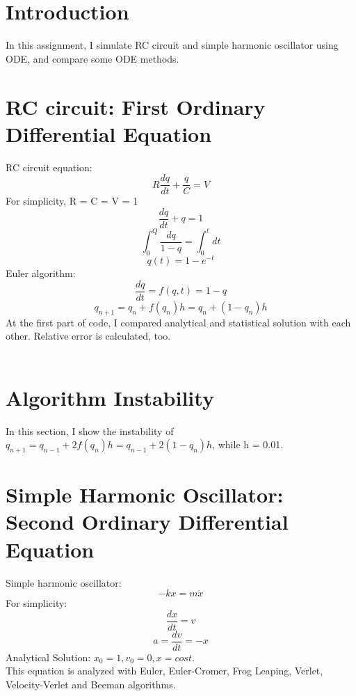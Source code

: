 \documentclass{article}
\begin{document}
\section{Introduction}
In this assignment, I simulate RC circuit and simple harmonic oscillator using ODE, and compare some ODE methods.
\section{RC circuit: First Ordinary Differential Equation}
RC circuit equation:\\
\begin{equation}
    R\frac{dq}{dt}+\frac{q}{C} = V
\end{equation}
For simplicity, R = C = V = 1\\
\begin{equation}
    \frac{dq}{dt}+q=1
\end{equation}
\begin{equation}
    \int _0^Q \frac{dq}{1-q} = \int _0^t dt
\end{equation}
\begin{equation}
    q(t) = 1 - e^{-t}
\end{equation}
Euler algorithm:\\
\begin{equation}
    \frac{dq}{dt} = f(q, t) = 1-q
\end{equation}
\begin{equation}
    q_{n+1} = q_n+f(q_n)h=q_n+(1-q_n)h
\end{equation}
At the first part of code, I compared analytical and statistical solution with each other. Relative error is calculated, too.\\ \\
\section{Algorithm Instability}
In this section, I show the instability of 
    $q_{n+1} = q_{n-1}+2f(q_n)h = q_{n-1}+2(1-q_n)h$, while h = 0.01.
\section{Simple Harmonic Oscillator: Second Ordinary Differential Equation}
Simple harmonic oscillator:\\
\begin{equation}
    -kx = m\ddot x
\end{equation}
For simplicity:\\
\begin{equation}
    \frac{dx}{dt}= v
\end{equation}
\begin{equation}
    a = \frac{dv}{dt} = -x
\end{equation}
Analytical Solution:
$x_0=1, v_0=0, x=cos t$.\\
This equation is analyzed with Euler, Euler-Cromer, Frog Leaping, Verlet, Velocity-Verlet and Beeman algorithms.
\end{document}
